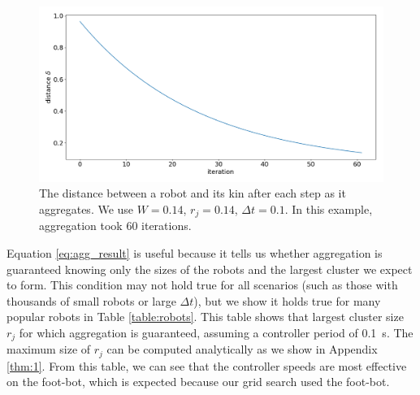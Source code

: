 \documentclass[conference]{IEEEtran}
\begin{document}
    \begin{figure}
      \centering
      \includegraphics[width=1\linewidth]{./images/dist_plot.png}
      \caption{The distance between a robot and its kin after each step as it aggregates. We use $W=0.14$, $r_j=0.14$, $\Delta t=0.1$. In this example, aggregation took 60 iterations.}
      \label{fig:dist_plot}
    \end{figure}

    Equation \eqref{eq:agg_result} is useful because it tells us whether aggregation is guaranteed knowing only the sizes of the robots and the largest cluster we expect to form. This condition may not hold true for all scenarios (such as those with thousands of small robots or large $\Delta t$), but we show it holds true for many popular robots in Table \ref{table:robots}. This table shows that largest cluster size $r_j$ for which aggregation is guaranteed, assuming a controller period of \SI{0.1}{\second}. The maximum size of $r_j$ can be computed analytically as we show in Appendix \ref{thm:1}. From this table, we can see that the controller speeds are most effective on the foot-bot, which is expected because our grid search used the foot-bot.
\end{document}
